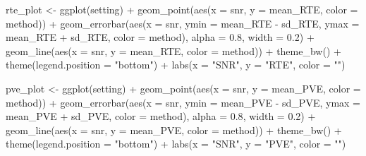\documentclass[
  letterpaper,
]{latex/krantz}
\makeatletter
\newenvironment{Shaded}{\begin{snugshade}}{\end{snugshade}}
\newcommand{\AttributeTok}[1]{\textcolor[rgb]{0.40,0.45,0.13}{#1}}
\newcommand{\FloatTok}[1]{\textcolor[rgb]{0.68,0.00,0.00}{#1}}
\newcommand{\FunctionTok}[1]{\textcolor[rgb]{0.28,0.35,0.67}{#1}}
\newcommand{\NormalTok}[1]{\textcolor[rgb]{0.00,0.23,0.31}{#1}}
\newcommand{\OtherTok}[1]{\textcolor[rgb]{0.00,0.23,0.31}{#1}}
\newcommand{\SpecialCharTok}[1]{\textcolor[rgb]{0.37,0.37,0.37}{#1}}
\newcommand{\StringTok}[1]{\textcolor[rgb]{0.13,0.47,0.30}{#1}}
\newenvironment{kframe}{%
\medskip{}
\setlength{\fboxsep}{.8em}
 \def\at@end@of@kframe{}%
 \ifinner\ifhmode%
  \def\at@end@of@kframe{\end{minipage}}%
  \begin{minipage}{\columnwidth}%
 \fi\fi%
 \def\FrameCommand##1{\hskip\@totalleftmargin \hskip-\fboxsep
 \colorbox{shadecolor}{##1}\hskip-\fboxsep
     \hskip-\linewidth \hskip-\@totalleftmargin \hskip\columnwidth}%
 \MakeFramed {\advance\hsize-\width
   \@totalleftmargin\z@ \linewidth\hsize
   \@setminipage}}%
 {\par\unskip\endMakeFramed%
 \at@end@of@kframe}
\renewenvironment{Shaded}{\begin{kframe}}{\end{kframe}}
\makeatother
\begin{document}
\begin{Shaded}
\begin{Highlighting}[]
\NormalTok{  rte\_plot }\OtherTok{\textless{}{-}} \FunctionTok{ggplot}\NormalTok{(setting) }\SpecialCharTok{+} 
    \FunctionTok{geom\_point}\NormalTok{(}\FunctionTok{aes}\NormalTok{(}\AttributeTok{x =}\NormalTok{ snr, }\AttributeTok{y =}\NormalTok{ mean\_RTE, }\AttributeTok{color =}\NormalTok{ method)) }\SpecialCharTok{+} 
    \FunctionTok{geom\_errorbar}\NormalTok{(}\FunctionTok{aes}\NormalTok{(}\AttributeTok{x =}\NormalTok{ snr, }\AttributeTok{ymin =}\NormalTok{ mean\_RTE }\SpecialCharTok{{-}}\NormalTok{ sd\_RTE, }
                      \AttributeTok{ymax =}\NormalTok{ mean\_RTE }\SpecialCharTok{+}\NormalTok{ sd\_RTE, }\AttributeTok{color =}\NormalTok{ method),}
                  \AttributeTok{alpha =} \FloatTok{0.8}\NormalTok{, }\AttributeTok{width =} \FloatTok{0.2}\NormalTok{) }\SpecialCharTok{+} 
    \FunctionTok{geom\_line}\NormalTok{(}\FunctionTok{aes}\NormalTok{(}\AttributeTok{x =}\NormalTok{ snr, }\AttributeTok{y =}\NormalTok{ mean\_RTE, }\AttributeTok{color =}\NormalTok{ method)) }\SpecialCharTok{+} 
    \FunctionTok{theme\_bw}\NormalTok{() }\SpecialCharTok{+} 
    \FunctionTok{theme}\NormalTok{(}\AttributeTok{legend.position =} \StringTok{"bottom"}\NormalTok{) }\SpecialCharTok{+} 
    \FunctionTok{labs}\NormalTok{(}\AttributeTok{x =} \StringTok{"SNR"}\NormalTok{, }\AttributeTok{y =} \StringTok{"RTE"}\NormalTok{, }\AttributeTok{color =} \StringTok{""}\NormalTok{)}
  
  
\NormalTok{  pve\_plot }\OtherTok{\textless{}{-}} \FunctionTok{ggplot}\NormalTok{(setting) }\SpecialCharTok{+} 
    \FunctionTok{geom\_point}\NormalTok{(}\FunctionTok{aes}\NormalTok{(}\AttributeTok{x =}\NormalTok{ snr, }\AttributeTok{y =}\NormalTok{ mean\_PVE, }\AttributeTok{color =}\NormalTok{ method)) }\SpecialCharTok{+} 
    \FunctionTok{geom\_errorbar}\NormalTok{(}\FunctionTok{aes}\NormalTok{(}\AttributeTok{x =}\NormalTok{ snr, }\AttributeTok{ymin =}\NormalTok{ mean\_PVE }\SpecialCharTok{{-}}\NormalTok{ sd\_PVE, }
                      \AttributeTok{ymax =}\NormalTok{ mean\_PVE }\SpecialCharTok{+}\NormalTok{ sd\_PVE, }\AttributeTok{color =}\NormalTok{ method),}
                  \AttributeTok{alpha =} \FloatTok{0.8}\NormalTok{, }\AttributeTok{width =} \FloatTok{0.2}\NormalTok{) }\SpecialCharTok{+} 
    \FunctionTok{geom\_line}\NormalTok{(}\FunctionTok{aes}\NormalTok{(}\AttributeTok{x =}\NormalTok{ snr, }\AttributeTok{y =}\NormalTok{ mean\_PVE, }\AttributeTok{color =}\NormalTok{ method)) }\SpecialCharTok{+} 
    \FunctionTok{theme\_bw}\NormalTok{() }\SpecialCharTok{+} 
    \FunctionTok{theme}\NormalTok{(}\AttributeTok{legend.position =} \StringTok{"bottom"}\NormalTok{) }\SpecialCharTok{+} 
    \FunctionTok{labs}\NormalTok{(}\AttributeTok{x =} \StringTok{"SNR"}\NormalTok{, }\AttributeTok{y =} \StringTok{"PVE"}\NormalTok{, }\AttributeTok{color =} \StringTok{""}\NormalTok{)}


\end{Highlighting}
\end{Shaded}
\end{document}
